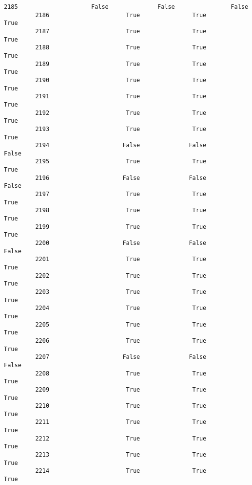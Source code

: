 \documentclass[11pt]{llncs}
\begin{document}
\begin{Verbatim}[commandchars=\\\{\}]
         2185                     False              False                False   
         2186                      True               True                 True   
         2187                      True               True                 True   
         2188                      True               True                 True   
         2189                      True               True                 True   
         2190                      True               True                 True   
         2191                      True               True                 True   
         2192                      True               True                 True   
         2193                      True               True                 True   
         2194                     False              False                False   
         2195                      True               True                 True   
         2196                     False              False                False   
         2197                      True               True                 True   
         2198                      True               True                 True   
         2199                      True               True                 True   
         2200                     False              False                False   
         2201                      True               True                 True   
         2202                      True               True                 True   
         2203                      True               True                 True   
         2204                      True               True                 True   
         2205                      True               True                 True   
         2206                      True               True                 True   
         2207                     False              False                False   
         2208                      True               True                 True   
         2209                      True               True                 True   
         2210                      True               True                 True   
         2211                      True               True                 True   
         2212                      True               True                 True   
         2213                      True               True                 True   
         2214                      True               True                 True   
         

\end{Verbatim}
\end{document}
